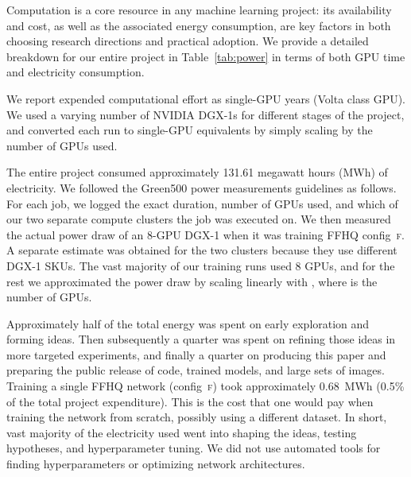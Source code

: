 \documentclass[10pt,twocolumn,letterpaper]{article}
\newcommand{\arch}[1]{\textsc{#1}}
\newcommand{\FINAL}[2][]{#2}
\begin{document}
\FINAL{
Computation is a core resource in any machine learning project: its availability and cost, as well as the associated energy consumption, are key factors in both choosing research directions and practical adoption. We provide a detailed breakdown for our entire project in Table~\ref{tab:power} in terms of both GPU time and electricity consumption.

We report expended computational effort as single-GPU years (Volta class GPU). We used a varying number of NVIDIA DGX-1s for different stages of the project, and converted each run to single-GPU equivalents by simply scaling by the number of GPUs used.

The entire project consumed approximately 131.61 megawatt hours (MWh) of electricity. We followed the Green500 power measurements guidelines \cite{Ge2020} as follows. 
For each job, we logged the exact duration, number of GPUs used, and which of our two separate compute clusters the job was executed on. We then measured the actual power draw of an 8-GPU DGX-1 when it was training \textsc{FFHQ} config~\arch{f}. A separate estimate was obtained for the two clusters because they use different DGX-1 SKUs. The vast majority of our training runs used 8 GPUs, and for the rest we approximated the power draw by scaling linearly with , where  is the number of GPUs. 

Approximately half of the total energy was spent on early exploration and forming ideas. Then subsequently a quarter was spent on refining those ideas in more targeted experiments, and finally a quarter on producing this paper and preparing the public release of code, trained models, and large sets of images. Training a single \textsc{FFHQ} network (config~\arch{f}) took approximately 0.68~MWh (0.5\% of the total project expenditure). This is the cost that one would pay when training the network from scratch, possibly using a different dataset. In short, vast majority of the electricity used went into shaping the ideas, testing hypotheses, and hyperparameter tuning. We did not use automated tools for finding hyperparameters or optimizing network architectures.
}

 \fi
\end{document}
